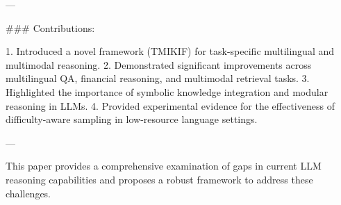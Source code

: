 ---

### Contributions:

1. Introduced a novel framework (TMIKIF) for task-specific multilingual and multimodal reasoning.
2. Demonstrated significant improvements across multilingual QA, financial reasoning, and multimodal retrieval tasks.
3. Highlighted the importance of symbolic knowledge integration and modular reasoning in LLMs.
4. Provided experimental evidence for the effectiveness of difficulty-aware sampling in low-resource language settings.

--- 

This paper provides a comprehensive examination of gaps in current LLM reasoning capabilities and proposes a robust framework to address these challenges.